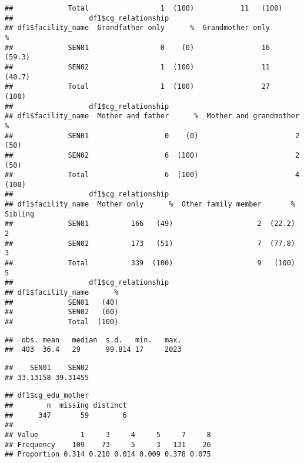 \documentclass[
]{article}
\begin{document}
\begin{verbatim}
##             Total                 1  (100)           11   (100)
##                  df1$cg_relationship
## df1$facility_name  Grandfather only      %  Grandmother only       %
##             SEN01                 0    (0)                16  (59.3)
##             SEN02                 1  (100)                11  (40.7)
##             Total                 1  (100)                27   (100)
##                  df1$cg_relationship
## df1$facility_name  Mother and father      %  Mother and grandmother      %
##             SEN01                  0    (0)                       2   (50)
##             SEN02                  6  (100)                       2   (50)
##             Total                  6  (100)                       4  (100)
##                  df1$cg_relationship
## df1$facility_name  Mother only      %  Other family member       %  Sibling
##             SEN01          166   (49)                    2  (22.2)        2
##             SEN02          173   (51)                    7  (77.8)        3
##             Total          339  (100)                    9   (100)        5
##                  df1$cg_relationship
## df1$facility_name      %
##             SEN01   (40)
##             SEN02   (60)
##             Total  (100)
\end{verbatim}

\begin{verbatim}
##  obs. mean   median  s.d.   min.   max.  
##  403  36.4   29      99.814 17     2023
\end{verbatim}

\begin{verbatim}
##    SEN01    SEN02 
## 33.13158 39.31455
\end{verbatim}

\begin{verbatim}
## df1$cg_edu_mother 
##        n  missing distinct 
##      347       59        6 
##                                               
## Value          1     3     4     5     7     8
## Frequency    109    73     5     3   131    26
## Proportion 0.314 0.210 0.014 0.009 0.378 0.075
\end{verbatim}
\end{document}
